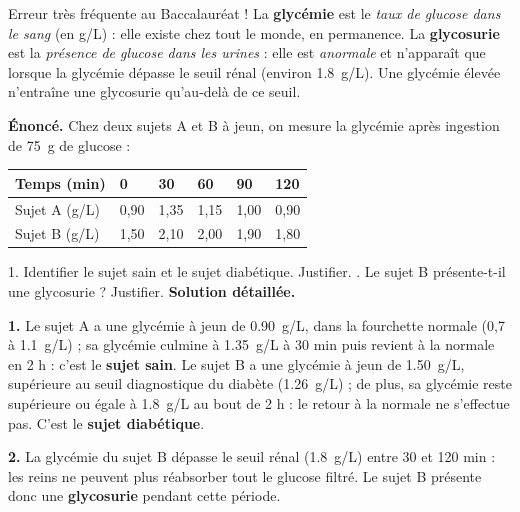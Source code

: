 \documentclass[11pt]{article}
\begin{document}
\begin{attention}
Erreur très fréquente au Baccalauréat ! La \textbf{glycémie} est le \emph{taux de glucose dans le sang} (en g/L) : elle existe chez tout le monde, en permanence. La \textbf{glycosurie} est la \emph{présence de glucose dans les urines} : elle est \emph{anormale} et n'apparaît que lorsque la glycémie dépasse le seuil rénal (environ \SI{1,8}{g/L}). Une glycémie élevée n'entraîne une glycosurie qu'au-delà de ce seuil.
\end{attention}

\begin{exoresolu}
\textbf{Énoncé.} Chez deux sujets A et B à jeun, on mesure la glycémie après ingestion de \SI{75}{g} de glucose :

\begin{center}
\begin{tabularx}{\linewidth}{|l|X|X|X|X|X|}
\hline
\rowcolor{popblueL} Temps (min) & 0 & 30 & 60 & 90 & 120 \\
\hline
Sujet A (g/L) & 0,90 & 1,35 & 1,15 & 1,00 & 0,90 \\
\hline
Sujet B (g/L) & 1,50 & 2,10 & 2,00 & 1,90 & 1,80 \\
\hline
\end{tabularx}
\end{center}

1. Identifier le sujet sain et le sujet diabétique. Justifier. . Le sujet B présente-t-il une glycosurie ? Justifier.
\tcblower
\textbf{Solution détaillée.}

\textbf{1.} Le sujet A a une glycémie à jeun de \SI{0,90}{g/L}, dans la fourchette normale (0,7 à \SI{1,1}{g/L}) ; sa glycémie culmine à \SI{1,35}{g/L} à 30 min puis revient à la normale en 2 h : c'est le \textbf{sujet sain}. Le sujet B a une glycémie à jeun de \SI{1,50}{g/L}, supérieure au seuil diagnostique du diabète (\SI{1,26}{g/L}) ; de plus, sa glycémie reste supérieure ou égale à \SI{1,8}{g/L} au bout de 2 h : le retour à la normale ne s'effectue pas. C'est le \textbf{sujet diabétique}.

\textbf{2.} La glycémie du sujet B dépasse le seuil rénal (\SI{1,8}{g/L}) entre 30 et 120 min : les reins ne peuvent plus réabsorber tout le glucose filtré. Le sujet B présente donc une \textbf{glycosurie} pendant cette période.
\end{exoresolu}
\end{document}
